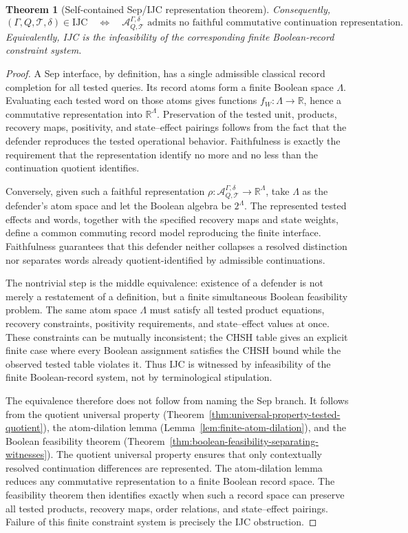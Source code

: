 \documentclass[11pt]{article}
\newtheorem{theorem}{Theorem}[section]
\newcommand{\IJC}{\mathrm{IJC}}
\begin{document}
\begin{theorem}[Self-contained Sep/IJC representation theorem]
Consequently,
\[
  (\Gamma,Q,\mathcal T,\delta)\in\IJC
  \quad\Longleftrightarrow\quad
  \mathcal A^{\Gamma,\delta}_{Q,\mathcal T}
  \text{ admits no faithful commutative continuation representation}.
\]
Equivalently, IJC is the infeasibility of the corresponding finite
Boolean-record constraint system.
\end{theorem}

\begin{proof}
A Sep interface, by definition, has a single admissible classical
record completion for all tested queries.  Its record atoms form a
finite Boolean space \(\Lambda\).  Evaluating each tested word on
those atoms gives functions \(f_W:\Lambda\to\mathbb R\), hence a
commutative representation into \(\mathbb R^\Lambda\).  Preservation
of the tested unit, products, recovery maps, positivity, and
state--effect pairings follows from the fact that the defender
reproduces the tested operational behavior.  Faithfulness is exactly
the requirement that the representation identify no more and no
less than the continuation quotient identifies.

Conversely, given such a faithful representation
\(\rho:\mathcal A^{\Gamma,\delta}_{Q,\mathcal T}\to\mathbb R^\Lambda\),
take \(\Lambda\) as the defender's atom space and let the Boolean
algebra be \(2^\Lambda\).  The represented tested effects and words,
together with the specified recovery maps and state weights, define
a common commuting record model reproducing the finite interface.
Faithfulness guarantees that this defender neither collapses a
resolved distinction nor separates words already quotient-identified
by admissible continuations.

The nontrivial step is the middle equivalence: existence of a
defender is not merely a restatement of a definition, but a finite
simultaneous Boolean feasibility problem.  The same atom space
\(\Lambda\) must satisfy all tested product equations, recovery
constraints, positivity requirements, and state--effect values at
once.  These constraints can be mutually inconsistent; the CHSH
table gives an explicit finite case where every Boolean assignment
satisfies the CHSH bound while the observed tested table violates
it.  Thus IJC is witnessed by infeasibility of the finite
Boolean-record system, not by terminological stipulation.

The equivalence therefore does not follow from naming the Sep branch.
It follows from the quotient universal property
(Theorem~\ref{thm:universal-property-tested-quotient}), the atom-dilation
lemma (Lemma~\ref{lem:finite-atom-dilation}), and the Boolean feasibility
theorem (Theorem~\ref{thm:boolean-feasibility-separating-witnesses}).
The quotient universal property ensures that only contextually resolved
continuation differences are represented.  The atom-dilation lemma
reduces any commutative representation to a finite Boolean record space.
The feasibility theorem then identifies exactly when such a record space
can preserve all tested products, recovery maps, order relations, and
state--effect pairings.  Failure of this finite constraint system is
precisely the IJC obstruction.
\end{proof}
\end{document}
